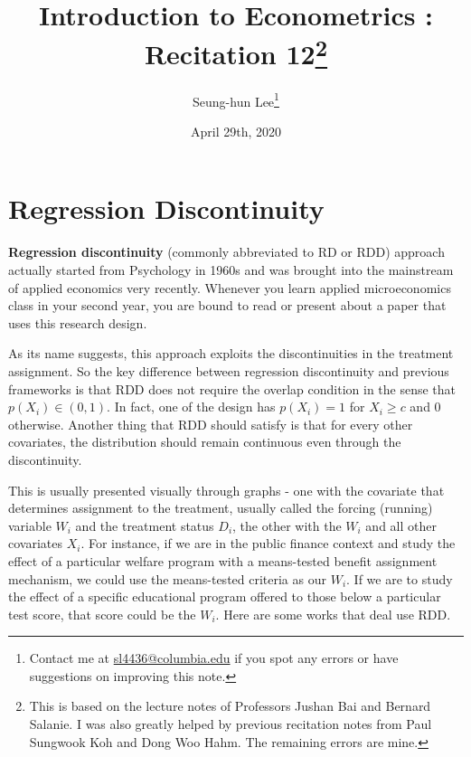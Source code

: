 \documentclass[12pt]{article}
\title{Introduction to Econometrics \ROM{2}: Recitation 12\footnote{This is based on the lecture notes of Professors Jushan Bai and Bernard Salanie. I was also greatly helped by previous recitation notes from Paul Sungwook Koh and Dong Woo Hahm. The remaining errors are mine. }}
\theoremstyle{definition}
\theoremstyle{property}
\theoremstyle{assumption}
\theoremstyle{example}
\theoremstyle{comment}
\begin{document}
\linespread{1.25}
\onehalfspacing

\author{Seung-hun Lee\footnote{Contact me at \href{mailto:sl4436@columbia.edu}{sl4436@columbia.edu} if you spot any errors or have suggestions on improving this note.}}
\date{April 29th, 2020}
\maketitle
\thispagestyle{firstpage}

\section{Regression Discontinuity}

\textbf{Regression discontinuity} (commonly abbreviated to RD or RDD) approach actually started from Psychology in 1960s and was brought into the mainstream of applied economics very recently. Whenever you learn applied microeconomics class in your second year, you are bound to read or present about a paper that uses this research design. \par
As its name suggests, this approach exploits the discontinuities in the treatment assignment. So the key difference between regression discontinuity and previous frameworks is that RDD does not require the overlap condition in the sense that $p(X_i)\in(0,1)$. In fact, one of the design has $p(X_i)=1$ for $X_i\geq c$ and $0$ otherwise. Another thing that RDD should satisfy is that for every other covariates, the distribution should remain continuous even through the discontinuity.\par
This is usually presented visually through graphs - one with the covariate that determines assignment to the treatment, usually called the forcing (running) variable $W_i$ and the treatment status $D_i$, the other with the $W_i$ and all other covariates $X_i$. For instance, if we are in the public finance context and study the effect of a particular welfare program with a means-tested benefit assignment mechanism, we could use the means-tested criteria as our $W_i$. If we are to study the effect of a specific educational program offered to those below a particular test score, that score could be the $W_i$. Here are some works that deal use RDD. 
\end{document}
